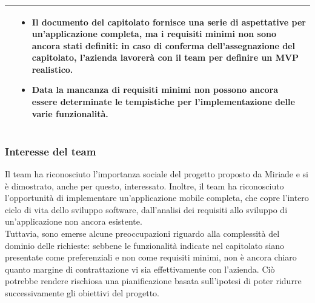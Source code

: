 \documentclass[a4paper,11pt]{article}
\begin{document}
{\begin{tabularx}{\textwidth}{|>{\raggedright\arraybackslash}X|>{\raggedright\arraybackslash}X|}
&
\begin{itemize}
 \item Il documento del capitolato fornisce una serie di aspettative per un'applicazione completa, ma i requisiti minimi non sono ancora stati definiti: in caso di conferma dell'assegnazione del capitolato, l'azienda lavorerà con il team per definire un MVP realistico.
 \item Data la mancanza di requisiti minimi non possono ancora essere determinate le tempistiche per l'implementazione delle varie funzionalità.
\end{itemize}\\
\hline
\end{tabularx}
} 
\subsubsection{Interesse del team}
\parbox[t]{\linewidth}{%
Il team ha riconosciuto l'importanza sociale del progetto proposto da Miriade e si è dimostrato, anche per questo, interessato.
Inoltre, il team ha riconosciuto l'opportunità di implementare un'applicazione mobile completa, che copre l'intero ciclo di vita dello sviluppo software, dall'analisi dei requisiti allo sviluppo di un'applicazione non ancora esistente.
\\Tuttavia, sono emerse alcune preoccupazioni riguardo alla complessità del dominio delle richieste: sebbene le funzionalità indicate nel capitolato siano presentate come preferenziali e non come requisiti minimi, non è ancora chiaro quanto margine di contrattazione vi sia effettivamente con l'azienda. Ciò potrebbe rendere rischiosa una pianificazione basata sull'ipotesi di poter ridurre successivamente gli obiettivi del progetto.}
\end{document}
